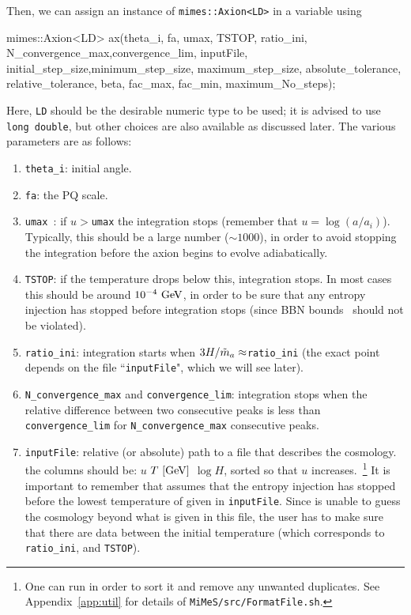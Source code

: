 \documentclass[11pt,a4paper]{article}
\begin{document}
Then, we can assign an instance of {\tt mimes::Axion<LD>} in a variable using
%
\begin{cpp}
	mimes::Axion<LD> ax(theta_i, fa, umax, TSTOP, ratio_ini, N_convergence_max,convergence_lim,
	inputFile, initial_step_size,minimum_step_size, maximum_step_size, absolute_tolerance, 
	relative_tolerance, beta, fac_max, fac_min, maximum_No_steps);
\end{cpp}
%
Here, {\tt LD} should be the desirable numeric type to be used; it is advised to use {\tt long double}, but other choices are also available as discussed later. The various parameters are as follows:
%
\begin{enumerate}
	\item {\tt theta\_i}: initial angle.
	\item {\tt fa}: the PQ scale.
	\item {\tt umax }: if $u>${\tt umax} the integration stops (remember that $u=\log(a/a_i)$). Typically, this should be a large number ($\sim 1000$), in order to avoid stopping the integration before the axion begins to evolve  adiabatically.    
	\item {\tt TSTOP}: if the temperature drops below this, integration stops. In most cases this should be around 
	$10^{-4}~{\rm GeV}$, in order to be sure that any entropy injection has stopped before integration stops (since BBN bounds~\cite{Kolb:206230,Peebles:1993} should not be violated).
	\item {\tt ratio\_ini}: integration starts when $3H/\tilde m_{a}{} \approx${\tt ratio\_ini} (the exact point depends on the file ``{\tt inputFile}", which we will see later). 
	\item  {\tt N\_convergence\_max} and {\tt convergence\_lim}: integration stops when the relative difference 
	between two consecutive peaks is less than {\tt convergence\_lim} for {\tt N\_convergence\_max} 
	consecutive peaks.
	\item  {\tt inputFile}: relative (or absolute) path to a file that describes the cosmology. the columns should be: $u$ $T ~[{\rm GeV}]$ $\log H$, sorted so that $u$ increases.~\footnote{One can run  in order to sort it and remove any unwanted duplicates. See Appendix~\ref{app:util} for details of {\tt MiMeS/src/FormatFile.sh}.}
	It is important to remember that \mimes assumes that the entropy injection has stopped before the lowest temperature of given in {\tt inputFile}. Since \mimes is unable to guess the cosmology beyond what is given in this file, the user has to make sure that there are data between the initial temperature (which corresponds to {\tt ratio\_ini}, and {\tt TSTOP}).
	

\end{enumerate}
\end{document}
